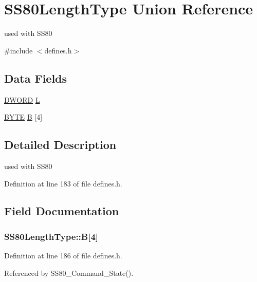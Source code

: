 \hypertarget{unionSS80LengthType}{}\section{S\+S80\+Length\+Type Union Reference}
\label{unionSS80LengthType}


used with S\+S80  




{\ttfamily \#include $<$defines.\+h$>$}

\subsection*{Data Fields}
\begin{DoxyCompactItemize}
\item 
\hyperlink{integer_8h_ad342ac907eb044443153a22f964bf0af}{D\+W\+O\+RD} \hyperlink{unionSS80LengthType_a8939afbd3197ba892aa2b15782086a71}{L}
\item 
\hyperlink{integer_8h_a4ae1dab0fb4b072a66584546209e7d58}{B\+Y\+TE} \hyperlink{unionSS80LengthType_ae34b090db3881e2a81df6daa00e09f96}{B} \mbox{[}4\mbox{]}
\end{DoxyCompactItemize}


\subsection{Detailed Description}
used with S\+S80 

Definition at line 183 of file defines.\+h.



\subsection{Field Documentation}
\subsubsection[{\texorpdfstring{B}{B}}]{ S\+S80\+Length\+Type\+::B\mbox{[}4\mbox{]}}\hypertarget{unionSS80LengthType_ae34b090db3881e2a81df6daa00e09f96}{}\label{unionSS80LengthType_ae34b090db3881e2a81df6daa00e09f96}


Definition at line 186 of file defines.\+h.



Referenced by S\+S80\+\_\+\+Command\+\_\+\+State().

